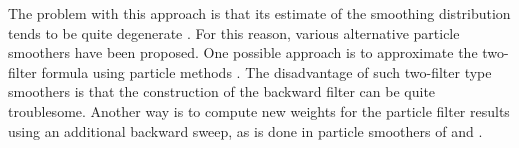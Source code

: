 \documentclass[twocolumn]{autart}    %
\begin{document}
%
The problem with this approach is that
its estimate of the smoothing distribution tends to be quite
degenerate \cite{Kitagawa:1996}. For this reason, various alternative
particle smoothers have been proposed. One possible approach is to
approximate the two-filter formula using particle methods
\cite{Kitagawa:1996,Briers+Doucet+Maskell:2010,Fearnhead:2010}.  The
disadvantage of such two-filter type smoothers is that the
construction of the backward filter can be quite troublesome. Another
way is to compute new weights for the particle filter results using an
additional backward sweep, as is done in particle smoothers of
\cite{Hurzeler+Kunsch:1998} and \cite{Doucet+Godsill+Andrieu:2000}.
\end{document}
